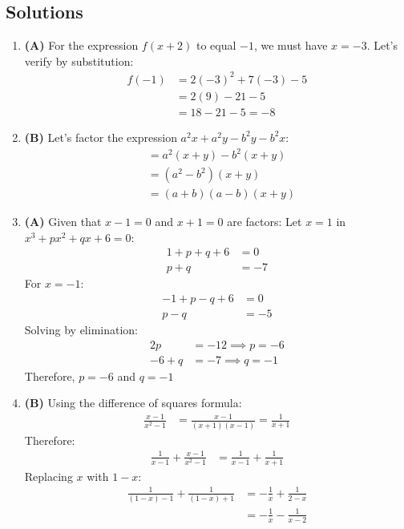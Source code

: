 \subsection{Solutions}
\begin{multicols}{2}
\begin{enumerate}[label={\textbf{\arabic*.}}]
\item \textbf{(A)} For the expression $f(x + 2)$ to equal $-1$, we must have $x = -3$.
Let's verify by substitution:
\begin{align*}
f(-1) &= 2(-3)^2 + 7(-3) - 5 \\
&= 2(9) - 21 - 5 \\
&= 18 - 21 - 5 = -8
\end{align*}

\item \textbf{(B)} Let's factor the expression \(a^2x + a^2y - b^2y - b^2x\):
\begin{align*}
&= a^2(x + y) - b^2(x + y) \\
&= (a^2 - b^2)(x + y) \\
&= (a + b)(a - b)(x + y)
\end{align*}

\item \textbf{(A)} Given that $x - 1 = 0$ and $x + 1 = 0$ are factors:
Let $x = 1$ in $x^3 + px^2 + qx + 6 = 0$:
\begin{align*}
1 + p + q + 6 &= 0 \\
p + q &= -7 \tag{i}
\end{align*}
For $x = -1$:
\begin{align*}
-1 + p - q + 6 &= 0 \\
p - q &= -5 \tag{ii}
\end{align*}
Solving by elimination:
\begin{align*}
2p &= -12 \implies p = -6 \\
-6 + q &= -7 \implies q = -1
\end{align*}
Therefore, $p = -6$ and $q = -1$

\item \textbf{(B)} Using the difference of squares formula:
\begin{align*}
\frac{x - 1}{x^2 - 1} &= \frac{x - 1}{(x+1)(x-1)} = \frac{1}{x + 1}
\end{align*}
Therefore:
\begin{align*}
\frac{1}{x - 1} + \frac{x - 1}{x^2 - 1} &= \frac{1}{x - 1} + \frac{1}{x + 1}
\end{align*}
Replacing $x$ with $1-x$:
\begin{align*}
\frac{1}{(1-x) - 1} + \frac{1}{(1-x) + 1} &= -\frac{1}{x} + \frac{1}{2-x} \\
&= -\frac{1}{x} - \frac{1}{x - 2}
\end{align*}


\end{enumerate}
\end{multicols}
